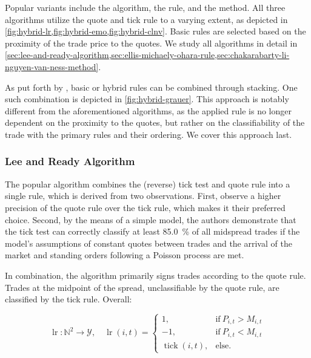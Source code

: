 Popular variants include the  algorithm, the  rule, and the  method. All three algorithms utilize the quote and tick rule to a varying extent, as depicted in \cref{fig:hybrid-lr,fig:hybrid-emo,fig:hybrid-clnv}. Basic rules are selected based on the proximity of the trade price to the quotes. We study all algorithms in detail in \cref{sec:lee-and-ready-algorithm,sec:ellis-michaely-ohara-rule,sec:chakarabarty-li-nguyen-van-ness-method}.


As put forth by \textcite[][18]{grauerOptionTradeClassification2022}, basic or hybrid rules can be combined through stacking. One such combination is depicted in \cref{fig:hybrid-grauer}. This approach is notably different from the aforementioned algorithms, as the applied rule is no longer dependent on the proximity to the quotes, but rather on the classifiability of the trade with the primary rules and their ordering. We cover this approach last.

\subsubsection{Lee and Ready Algorithm}\label{sec:lee-and-ready-algorithm}

The popular  algorithm \autocite[][745]{leeInferringTradeDirection1991} combines the (reverse) tick test and quote rule into a single rule, which is derived from two observations. First, \textcite[][735--743]{leeInferringTradeDirection1991} observe a higher precision of the quote rule over the tick rule, which makes it their preferred choice. Second, by the means of a simple model, the authors demonstrate that the tick test can correctly classify at least \SI{85.0}{\percent} of all midspread trades if the model's assumptions of constant quotes between trades and the arrival of the market and standing orders following a Poisson process are met.

In combination, the algorithm primarily signs trades according to the quote rule. Trades at the midpoint of the spread, unclassifiable by the quote rule, are classified by the tick rule. Overall:

\begin{equation}
    \operatorname{lr} \colon \mathbb{N}^2 \to \mathcal{Y},\quad\operatorname{lr}(i,t)=
    \begin{cases}
        1,                         & \text{if}\ P_{i, t} > M_{i, t} \\
        -1,                        & \text{if}\ P_{i, t} < M_{i, t} \\
        \operatorname{tick}(i, t), & \text{else}.
    \end{cases}
\end{equation}

